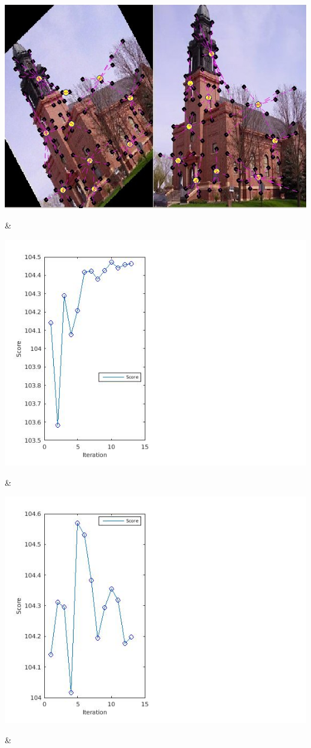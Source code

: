 \documentclass[
	fontsize=12pt,
	paper=a4,
	twoside=false,
	numbers=noenddot,
	plainheadsepline,
	toc=listof,
	toc=bibliography
]{scrartcl}
\begin{document}
\begin{landscape}
\begin{table}
\begin{tabular}
		\rule{0pt}{5cm}
		\parbox[t]{1em}{
			\includegraphics[scale = 0.2]{fig/initial_graphs3.jpg}}  & 
		\parbox[b]{1em}{
			\includegraphics[scale = 0.28]{fig/method1/test3/accuracy_HL.jpg}}  & 
		\parbox[b]{1em}{
			\includegraphics[scale = 0.28]{fig/method2/test3/accuracy_HL.jpg}}  &

\end{tabular}
\end{table}
\end{landscape}
\end{document}
